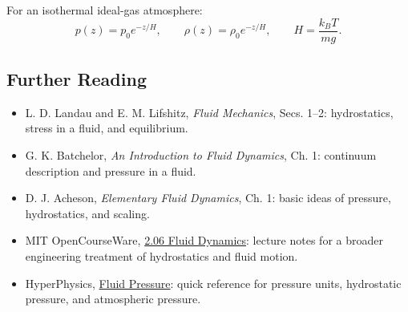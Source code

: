 \documentclass[../main.tex]{subfiles}
\begin{document}
For an isothermal ideal-gas atmosphere:
\begin{equation}
  \boxed{p(z)=p_0e^{-z/H},\qquad \rho(z)=\rho_0e^{-z/H},\qquad H=\frac{k_BT}{mg}.}
  \label{eq:lec10_summary_atmosphere}
\end{equation}

\subsection*{Further Reading}
\begin{itemize}
  \item L. D. Landau and E. M. Lifshitz, \textit{Fluid Mechanics}, Secs. 1--2: hydrostatics, stress in a fluid, and equilibrium.
  \item G. K. Batchelor, \textit{An Introduction to Fluid Dynamics}, Ch. 1: continuum description and pressure in a fluid.
  \item D. J. Acheson, \textit{Elementary Fluid Dynamics}, Ch. 1: basic ideas of pressure, hydrostatics, and scaling.
  \item MIT OpenCourseWare, \href{https://ocw.mit.edu/courses/2-06-fluid-dynamics-spring-2013/}{2.06 Fluid Dynamics}: lecture notes for a broader engineering treatment of hydrostatics and fluid motion.
  \item HyperPhysics, \href{http://hyperphysics.phy-astr.gsu.edu/hbase/pflu.html}{Fluid Pressure}: quick reference for pressure units, hydrostatic pressure, and atmospheric pressure.
\end{itemize}
\end{document}

